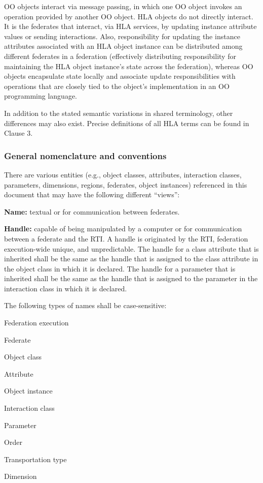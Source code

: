 OO objects interact via message passing, in which one OO object invokes an operation provided by another OO object. HLA objects do not directly interact. It is the federates that interact, via HLA services, by updating instance attribute values or sending interactions. Also, responsibility for updating the instance attributes associated with an HLA object instance can be distributed among different federates in a federation (effectively distributing responsibility for maintaining the HLA object instance's state across the federation), whereas OO objects encapsulate state locally and associate update responsibilities with operations that are closely tied to the object's implementation in an OO programming language.

In addition to the stated semantic variations in shared terminology, other differences may also exist. Precise definitions of all HLA terms can be found in Clause 3.

\subsubsection{General nomenclature and conventions}

There are various entities (e.g., object classes, attributes, interaction classes, parameters, dimensions, regions, federates, object instances) referenced in this document that may have the following different ``views'':

\begin{stddashlist}
    \item \textbf{Name:} textual or for communication between federates.
    \item \textbf{Handle:} capable of being manipulated by a computer or for communication between a federate and the RTI. A handle is originated by the RTI, federation execution-wide unique, and unpredictable. The handle for a class attribute that is inherited shall be the same as the handle that is assigned to the class attribute in the object class in which it is declared. The handle for a parameter that is inherited shall be the same as the handle that is assigned to the parameter in the interaction class in which it is declared.
\end{stddashlist}

The following types of names shall be case-sensitive:

\begin{stddashlist}
    \item Federation execution
    \item Federate
    \item Object class
    \item Attribute
    \item Object instance
    \item Interaction class
    \item Parameter
    \item Order
    \item Transportation type
    \item Dimension
\end{stddashlist}

